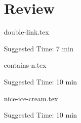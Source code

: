 \documentclass{exam}
\begin{document}
\section{Review}
\begin{questions}
    {double-link.tex}
    \begin{questionmeta}
        Suggested Time: 7 min
    \end{questionmeta}

    {contains-n.tex}
    \begin{questionmeta}
        Suggested Time: 10 min
    \end{questionmeta}


    {nice-ice-cream.tex}
    \begin{questionmeta}
        Suggested Time: 10 min
    \end{questionmeta}
\end{questions}
\end{document}
